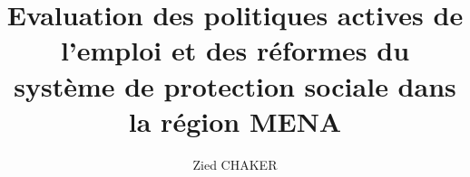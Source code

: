 \fancyhead[LE]{\textbf{\thepage}}
\fancyhead[LO]{\leftmark}
\fancyhead[RE]{\leftmark}
\fancyhead[RO]{\textbf{\thepage}}
\fancyfoot[C]{} 
\fancyfoot[L]{}
\fancyfoot[R]{}
\makeatletter

\newcommand{\thechaptername}{}

\renewcommand{\chaptermark}[1]
            {
              \markboth{#1}{}
              \renewcommand{\thechaptername}{#1}
            }

\pretocmd{\caption}
 {\ifnumequal
  {\value{chapter}}
  {\value{chapter@last}}
  {}
  {
    {\protect\numberline{\bfseries\thechapter\quad\thechaptername}}
    {\protect\numberline{\bfseries\thechapter\quad\thechaptername}}
   \setcounter{chapter@last}{\value{chapter}}
  }
  }
  {}
  {}

\makeatother


\title{Evaluation des politiques actives de l'emploi et des réformes du système de protection sociale dans la région MENA}

\author{Zied CHAKER}





